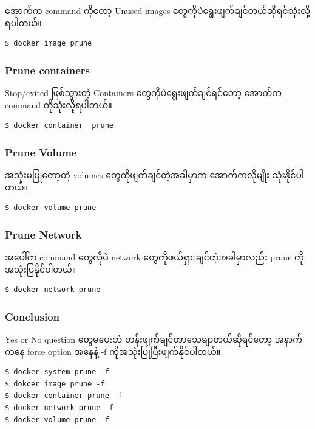 \documentclass{article}
\begin{document}
အောက်က command ကိုတော့ Unused images
တွေကိုပဲရွေးဖျက်ချင်တယ်ဆိုရင်သုံးလို့ရပါတယ်။

\begin{verbatim}
$ docker image prune
\end{verbatim}

\subsubsection{Prune containers}\label{prune-containers}

Stop/exited ဖြစ်သွားတဲ့ Containers တွေကိုပဲရွေးဖျက်ချင်ရင်တော့ အောက်က
command ကိုသုံးလို့ရပါတယ်။

\begin{verbatim}
$ docker container  prune
\end{verbatim}

\subsubsection{Prune Volume}\label{prune-volume}

အသုံးမပြုတော့တဲ့ volumes တွေကိုဖျက်ချင်တဲ့အခါမှာက အောက်ကလိုမျိုး
သုံးနိုင်ပါတယ်။

\begin{verbatim}
$ docker volume prune
\end{verbatim}

\subsubsection{Prune Network}\label{prune-network}

အပေါ်က command တွေလိုပဲ network တွေကိုဖယ်ရှားချင်တဲ့အခါမှာလည်း prune
ကိုအသုံးပြနိုင်ပါတယ်။

\begin{verbatim}
$ docker network prune
\end{verbatim}

\subsubsection{Conclusion}\label{conclusion}

Yes or No question တွေမပေးဘဲ တန်းဖျက်ချင်တာသေချာတယ်ဆိုရင်တော့ အနာက်ကနေ
force option အနေနဲ့ -f ကိုအသုံးပြုပြီးဖျက်နိုင်ပါတယ်။

\begin{verbatim}
$ docker system prune -f
$ dokcer image prune -f
$ docker container prune -f
$ docker network prune -f
$ docker volume prune -f
\end{verbatim}
\end{document}
